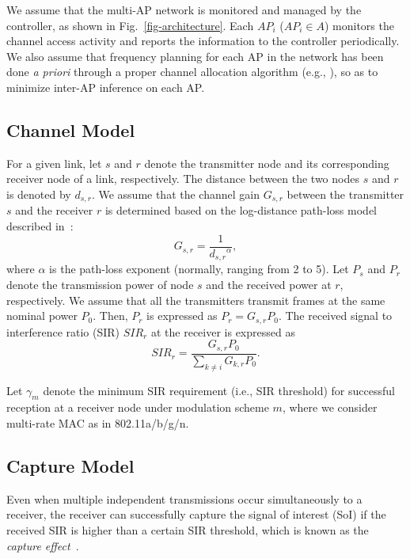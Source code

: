 We assume that the multi-AP network is monitored and managed by the
controller, as shown in Fig.~\ref{fig-architecture}. Each $AP_i$
($AP_i \in A$) monitors the channel access activity and reports the
information to the controller periodically.
%
We also assume that frequency planning for each AP in the network
has been done {\em a priori} through a proper channel allocation algorithm
(e.g., \cite{Mishra_MC2R_2005, client_driven06, Mishra_06}), %
so as to minimize inter-AP inference on each AP.

\subsection{Channel Model}
%
For a given link, let $s$ and $r$ denote the transmitter node
and its corresponding receiver node of a link, respectively.
The distance between the two nodes $s$ and $r$ is
denoted by $d_{s,r}$.
%
We assume that the channel gain $G_{s,r}$ between the transmitter $s$
and the receiver $r$ is determined based on the log-distance
path-loss model described in~\cite{Tse:Viswanath05}:
\begin{equation} \label{eq:pathloss}
G_{s,r} = \frac{1}{{d_{s,r}}^{\alpha}},
\end{equation}
where $\alpha$ is the path-loss exponent (normally, ranging from 2 to 5).
%
Let $P_{s}$ and $P_{r}$ denote the transmission power of node $s$
and the received power at $r$, respectively.
We assume that all the transmitters transmit frames at the same
nominal power $P_{0}$.
%
Then, $P_{r}$ is expressed as $P_{r}=G_{s,r}P_{0}$.
%
The received signal to interference ratio (SIR) $SIR_{r}$
at the receiver is expressed as
\begin{equation}
SIR_{r} = \frac{G_{s,r}P_{0}}{\sum_{k\neq i}{G_{k, r}P_{0}}}.
\end{equation}

Let $\gamma_{m}$ denote the minimum SIR requirement (i.e., SIR threshold)
for successful reception at a receiver node under modulation
scheme $m$, where we consider multi-rate MAC as in 802.11a/b/g/n.



\subsection{Capture Model}
%
Even when multiple independent transmissions occur simultaneously
to a receiver, the receiver can successfully capture the signal of
interest (SoI) if the received SIR is higher than a certain SIR
threshold, which is known as the {\em capture effect}~\cite{jlee:ychoi07}.

